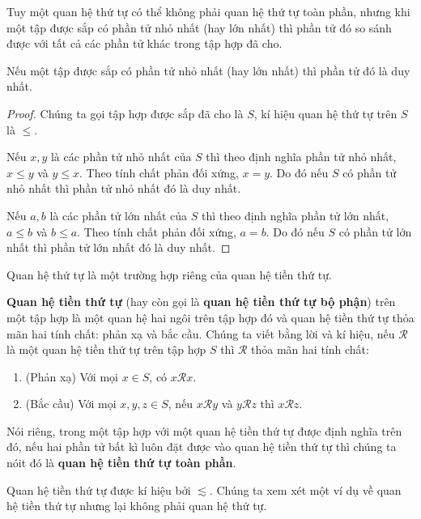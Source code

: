Tuy một quan hệ thứ tự có thể không phải quan hệ thứ tự toàn phần, nhưng khi một tập được sắp có phần tử nhỏ nhất (hay lớn nhất) thì phần tử đó so sánh được với tất cả các phần tử khác trong tập hợp đã cho.

\begin{theorem}
    Nếu một tập được sắp có phần tử nhỏ nhất (hay lớn nhất) thì phần tử đó là duy nhất.
\end{theorem}

\begin{proof}
    Chúng ta gọi tập hợp được sắp đã cho là $S$, kí hiệu quan hệ thứ tự trên $S$ là $\leq$.

    Nếu $x, y$ là các phần tử nhỏ nhất của $S$ thì theo định nghĩa phần tử nhỏ nhất, $x\leq y$ và $y\leq x$. Theo tính chất phản đối xứng, $x = y$. Do đó nếu $S$ có phần tử nhỏ nhất thì phần tử nhỏ nhất đó là duy nhất.

    Nếu $a, b$ là các phần tử lớn nhất của $S$ thì theo định nghĩa phần tử lớn nhất, $a\leq b$ và $b\leq a$. Theo tính chất phản đối xứng, $a = b$. Do đó nếu $S$ có phần tử lớn nhất thì phần tử lớn nhất đó là duy nhất.
\end{proof}

Quan hệ thứ tự là một trường hợp riêng của quan hệ tiền thứ tự.

\begin{definition}
    \textbf{Quan hệ tiền thứ tự} (hay còn gọi là \textbf{quan hệ tiền thứ tự bộ phận}) trên một tập hợp là một quan hệ hai ngôi trên tập hợp đó và quan hệ tiền thứ tự thỏa mãn hai tính chất: phản xạ và bắc cầu. Chúng ta viết bằng lời và kí hiệu, nếu $\mathscr{R}$ là một quan hệ tiền thứ tự trên tập hợp $S$ thì $\mathscr{R}$ thỏa mãn hai tính chất:
    \begin{enumerate}[label={(\roman*)}]
        \item (Phản xạ) Với mọi $x\in S$, có $x\mathscr{R}x$.
        \item (Bắc cầu) Với mọi $x, y, z\in S$, nếu $x\mathscr{R}y$ và $y\mathscr{R}z$ thì $x\mathscr{R}z$.
    \end{enumerate}

    \noindent Nói riêng, trong một tập hợp với một quan hệ tiền thứ tự được định nghĩa trên đó, nếu hai phần tử bất kì luôn đặt được vào quan hệ tiền thứ tự thì chúng ta nóit đó là \textbf{quan hệ tiền thứ tự toàn phần}.
\end{definition}

Quan hệ tiền thứ tự được kí hiệu bởi $\lesssim$. Chúng ta xem xét một ví dụ về quan hệ tiền thứ tự nhưng lại không phải quan hệ thứ tự.

